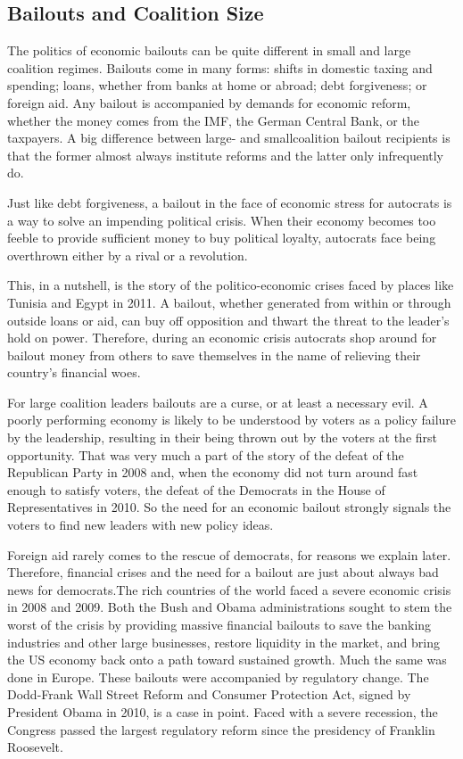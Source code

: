 \documentclass[10pt]{article}
\begin{document}
\subsection{Bailouts and Coalition Size}

{\large The politics of economic bailouts can be quite different in small and
large coalition regimes. Bailouts come in many forms: shifts in domestic taxing
and spending; loans, whether from banks at home or abroad; debt forgiveness; or
foreign aid. Any bailout is accompanied by demands for economic reform, whether
the money comes from the IMF, the German Central Bank, or the taxpayers. A big
difference between large- and smallcoalition bailout recipients is that the
former almost always institute reforms and the latter only infrequently do.}

{\large Just like debt forgiveness, a bailout in the face of economic stress for
autocrats is a way to solve an impending political crisis. When their economy
becomes too feeble to provide sufficient money to buy political loyalty,
autocrats face being overthrown either by a rival or a revolution.}

{\large This, in a nutshell, is the story of the politico-economic crises faced
by places like Tunisia and Egypt in 2011. A bailout, whether generated from
within or through outside loans or aid, can buy off opposition and thwart the
threat to the leader's hold on power. Therefore, during an economic crisis
autocrats shop around for bailout money from others to save themselves in the
name of relieving their country's financial woes.}

{\large For large coalition leaders bailouts are a curse, or at least a
necessary evil. A poorly performing economy is likely to be understood by voters
as a policy failure by the leadership, resulting in their being thrown out by the
voters at the first opportunity. That was very much a part of the story of the
defeat of the Republican Party in 2008 and, when the economy did not turn around
fast enough to satisfy voters, the defeat of the Democrats in the House of
Representatives in 2010. So the need for an economic bailout strongly signals the
voters to find new leaders with new policy ideas.}

{\large Foreign aid rarely comes to the rescue of democrats, for reasons we
explain later. Therefore, financial crises and the need for a bailout are just
about always bad news for democrats.The rich countries of the world faced a
severe economic crisis in 2008 and 2009. Both the Bush and Obama administrations
sought to stem the worst of the crisis by providing massive financial bailouts to
save the banking industries and other large businesses, restore liquidity in the
market, and bring the US economy back onto a path toward sustained growth. Much
the same was done in Europe. These bailouts were accompanied by regulatory
change. The Dodd-Frank Wall Street Reform and Consumer Protection Act, signed by
President Obama in 2010, is a case in point. Faced with a severe recession, the
Congress passed the largest regulatory reform since the presidency of Franklin
Roosevelt.}
\end{document}

